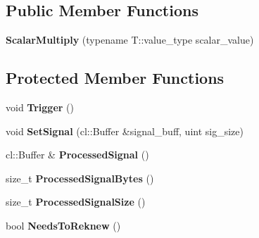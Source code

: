 \subsection*{Public Member Functions}
\begin{DoxyCompactItemize}
\item 
{\bfseries Scalar\+Multiply} (typename T\+::value\+\_\+type scalar\+\_\+value)\hypertarget{classjaspl_1_1ocl_1_1_scalar_multiply_a099a4868b984eea4d24c12c09933ee61}{}\label{classjaspl_1_1ocl_1_1_scalar_multiply_a099a4868b984eea4d24c12c09933ee61}

\end{DoxyCompactItemize}
\subsection*{Protected Member Functions}
\begin{DoxyCompactItemize}
\item 
void {\bfseries Trigger} ()\hypertarget{classjaspl_1_1ocl_1_1_scalar_multiply_a3797b44ad387b0bcd17413d11638d1c2}{}\label{classjaspl_1_1ocl_1_1_scalar_multiply_a3797b44ad387b0bcd17413d11638d1c2}

\item 
void {\bfseries Set\+Signal} (cl\+::\+Buffer \&signal\+\_\+buff, uint sig\+\_\+size)\hypertarget{classjaspl_1_1ocl_1_1_scalar_multiply_a21b27b0ec45a7327e6ddc25ea5f4d99a}{}\label{classjaspl_1_1ocl_1_1_scalar_multiply_a21b27b0ec45a7327e6ddc25ea5f4d99a}

\item 
cl\+::\+Buffer \& {\bfseries Processed\+Signal} ()\hypertarget{classjaspl_1_1ocl_1_1_scalar_multiply_acf198b3228d0b03e2c1ea12d67e387ff}{}\label{classjaspl_1_1ocl_1_1_scalar_multiply_acf198b3228d0b03e2c1ea12d67e387ff}

\item 
size\+\_\+t {\bfseries Processed\+Signal\+Bytes} ()\hypertarget{classjaspl_1_1ocl_1_1_scalar_multiply_a172e6495393f3d9b3618e471c103c95e}{}\label{classjaspl_1_1ocl_1_1_scalar_multiply_a172e6495393f3d9b3618e471c103c95e}

\item 
size\+\_\+t {\bfseries Processed\+Signal\+Size} ()\hypertarget{classjaspl_1_1ocl_1_1_scalar_multiply_ab76f39422e316fa67499cf07e8db7b4a}{}\label{classjaspl_1_1ocl_1_1_scalar_multiply_ab76f39422e316fa67499cf07e8db7b4a}

\item 
bool {\bfseries Needs\+To\+Reknew} ()\hypertarget{classjaspl_1_1ocl_1_1_scalar_multiply_a245ff6645743ee6e35d9977f68c3f70d}{}\label{classjaspl_1_1ocl_1_1_scalar_multiply_a245ff6645743ee6e35d9977f68c3f70d}

\end{DoxyCompactItemize}
